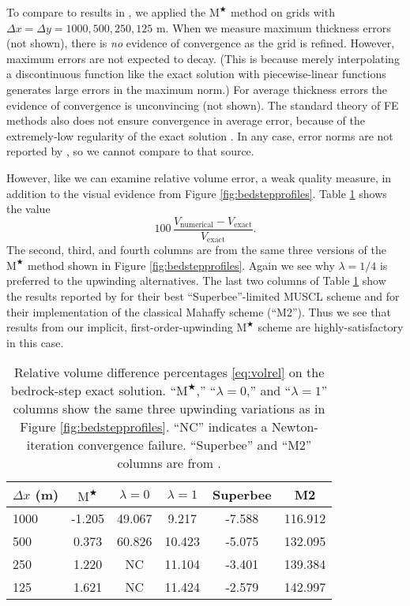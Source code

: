 \documentclass[review,letterpaper]{igs}
\newcommand{\Mstar}{$\text{M}^{\bigstar}$\xspace}
\begin{document}
To compare to results in \citep{JaroschSchoofAnslow2013}, we applied the \Mstar method on grids with $\Delta x=\Delta y = 1000,500,250,125$ m.  When we measure maximum thickness errors (not shown), there is \emph{no} evidence of convergence as the grid is refined.  However, maximum errors are not expected to decay.  (This is because merely interpolating a discontinuous function like the exact solution with piecewise-linear functions generates large errors in the maximum norm.)  For average thickness errors the evidence of convergence is unconvincing (not shown).  The standard theory of FE methods also does not ensure convergence in average error, because of the extremely-low regularity of the exact solution \citep{Elmanetal2005}.  In any case, error norms are not reported by \cite{JaroschSchoofAnslow2013}, so we cannot compare to that source.

However, like \cite{JaroschSchoofAnslow2013} we can examine relative volume error, a weak quality measure, in addition to the visual evidence from Figure \ref{fig:bedstepprofiles}.  Table \ref{tab:bedstepvol} shows the value
\begin{equation}
100\, \frac{V_{\text{numerical}} - V_{\text{exact}}}{V_{\text{exact}}}. \label{eq:volrel}
\end{equation}
The second, third, and fourth columns are from the same three versions of the \Mstar method shown in Figure \ref{fig:bedstepprofiles}.  Again we see why $\lambda=1/4$ is preferred to the upwinding alternatives.  The last two columns of Table \ref{tab:bedstepvol} show the results reported by \cite{JaroschSchoofAnslow2013} for their best ``Superbee''-limited MUSCL scheme and for their implementation of the classical Mahaffy scheme (``M2'').  Thus we see that results from our implicit, first-order-upwinding \Mstar scheme are highly-satisfactory in this case.

\begin{table}[ht]
  \caption{Relative volume difference percentages \eqref{eq:volrel} on the bedrock-step exact solution.  ``\Mstar,'' ``$\lambda=0$,'' and ``$\lambda=1$'' columns show the same three upwinding variations as in Figure \ref{fig:bedstepprofiles}.  ``NC'' indicates a Newton-iteration convergence failure.  ``Superbee'' and ``M2'' columns are from \cite{JaroschSchoofAnslow2013}.}
  \vskip4mm \centering
  \begin{tabular}{lccccc}
    $\Delta x$ (m) & \Mstar & $\lambda=0$ & $\lambda=1$ & Superbee & M2 \\  \hline
%
1000 &  -1.205 &  49.067 &   9.217 &  -7.588 & 116.912 \\
 500 &   0.373 &  60.826 &  10.423 &  -5.075 & 132.095 \\
 250 &   1.220 &  NC &  11.104 &  -3.401 & 139.384 \\
 125 &   1.621 &  NC &  11.424 &  -2.579 & 142.997 \\
  \end{tabular}
  \label{tab:bedstepvol}
\end{table}
\end{document}
